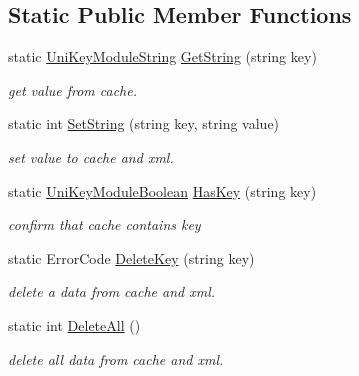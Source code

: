 \subsection*{Static Public Member Functions}
\begin{DoxyCompactItemize}
\item 
static \mbox{\hyperlink{struct_siege_module_1_1_uni_key_module_string}{Uni\+Key\+Module\+String}} \mbox{\hyperlink{class_siege_module_1_1_uni_key_module_other_af31fe254c5de6ef3f85001865801d0af}{Get\+String}} (string key)
\begin{DoxyCompactList}\small\item\em get value from cache. \end{DoxyCompactList}\item 
static int \mbox{\hyperlink{class_siege_module_1_1_uni_key_module_other_a3c863fcdc7762d02692f88f18240ed4c}{Set\+String}} (string key, string value)
\begin{DoxyCompactList}\small\item\em set value to cache and xml. \end{DoxyCompactList}\item 
static \mbox{\hyperlink{struct_siege_module_1_1_uni_key_module_boolean}{Uni\+Key\+Module\+Boolean}} \mbox{\hyperlink{class_siege_module_1_1_uni_key_module_other_adb8428817e6364d8cf1417c8806f9b80}{Has\+Key}} (string key)
\begin{DoxyCompactList}\small\item\em confirm that cache contains key \end{DoxyCompactList}\item 
static Error\+Code \mbox{\hyperlink{class_siege_module_1_1_uni_key_module_other_a273d7ae437e207ed153e5233e0887297}{Delete\+Key}} (string key)
\begin{DoxyCompactList}\small\item\em delete a data from cache and xml. \end{DoxyCompactList}\item 
static int \mbox{\hyperlink{class_siege_module_1_1_uni_key_module_other_adc5fcb32fc28119ca512c842f11d1d12}{Delete\+All}} ()
\begin{DoxyCompactList}\small\item\em delete all data from cache and xml. \end{DoxyCompactList}\end{DoxyCompactItemize}
